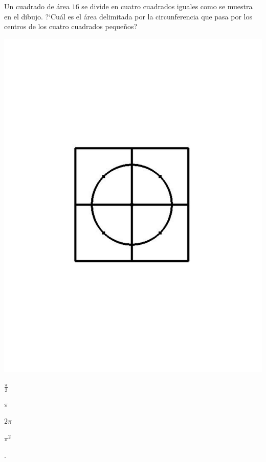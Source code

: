 \begin{Solucion}
  
\end{Solucion}

\begin{Problema}{7}
  Un cuadrado de \'area $16$ se divide en cuatro cuadrados iguales
  como se muestra en el dibujo. ?`Cu\'al es el \'area delimitada por
  la circunferencia que pasa por los centros de los cuatro cuadrados
  peque\~nos?

  \begin{center}
    \includegraphics[scale=0.5,viewport=146 243 466 549]{cuadrado_con_circunferencia.pdf}
  \end{center}

  \begin{inparaenum}
  \item $\frac{\pi}{2}$ \esp
  \item $\pi$ \esp
  \item $2 \pi$ \esp
  \item $\pi^2$ \esp
  \item \nota.
  \end{inparaenum}
\end{Problema}

